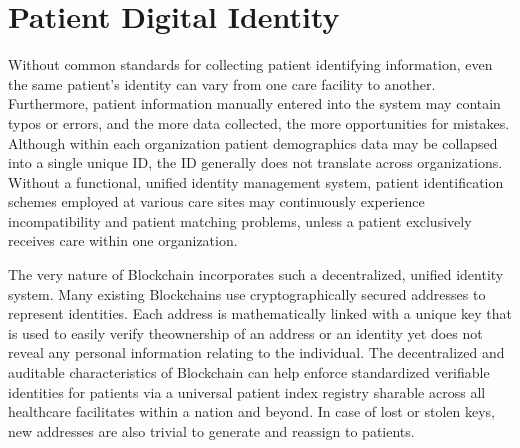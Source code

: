 \documentclass[12pt]{report}
\begin{document}
\section{Patient Digital Identity}
Without common standards for collecting patient identifying information, even the
same patient’s identity can vary from one care facility to another.  Furthermore, patient information manually
entered into the system may contain typos or errors, and the more data collected, the more
opportunities for mistakes. Although within each organization patient demographics data
may be collapsed into a single unique ID, the ID generally does not translate across organizations.
Without a functional, unified identity management system, patient identification
schemes employed at various care sites may continuously experience incompatibility and patient matching problems, unless a patient exclusively receives care within one organization.
\newline
\par
The very nature of Blockchain incorporates such a decentralized, unified identity system. Many existing Blockchains use cryptographically secured addresses to represent identities. Each address is mathematically linked with a unique key that is used to easily verify theownership of an address or an identity yet does not reveal any personal information relating
to the individual. The decentralized and auditable characteristics of Blockchain can help enforce standardized verifiable identities for patients via a universal patient index registry sharable across all healthcare facilitates within a nation and beyond. In case of lost or stolen keys, new addresses are also trivial to generate and reassign to patients.
\end{document}

